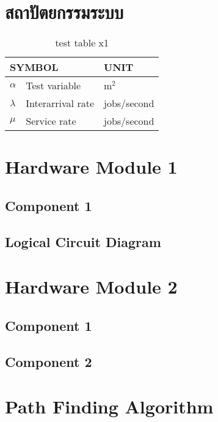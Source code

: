 \documentclass[12pt,oneside,openright,a4paper]{cpe-thai-project}
\begin{document}
\section{สถาปัตยกรรมระบบ}

\begin{table}[!h]
\centering
\caption{test table x1}\label{tbl:symbols}
\begin{tabular}{@{}p{}|p{}p{}}\hline
\multicolumn{2}{l}{\textbf{SYMBOL}}  & \textbf{UNIT} \\ \hline 
$\alpha$ & Test variable\hfill & m$^2$ \\
$\lambda$ & Interarrival rate\hfill &  jobs/second\\
$\mu$ & Service rate\hfill & jobs/second \\ \hline
\end{tabular}
\end{table}



\section{Hardware Module 1}
\subsection{Component 1}
\subsection{Logical Circuit Diagram}

\section{Hardware Module 2}
\subsection{Component 1}
\subsection{Component 2}

\section{Path Finding Algorithm}
\end{document}
